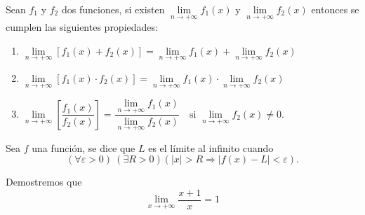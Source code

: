 \begin{property}
	Sean \(f_1\) y \(f_2\) dos funciones, si existen \(\lim\limits_{n\to+\infty}f_1(x)\) y \(\lim\limits_{n\to+\infty}f_2(x)\) entonces se cumplen las siguientes propiedades:
	\begin{enumerate}
		\item \(\lim\limits_{n\to+\infty}\left[f_1(x)+f_2(x)\right]=\lim\limits_{n\to+\infty}f_1(x)+\lim\limits_{n\to+\infty}f_2(x)\)						\item \(\lim\limits_{n\to+\infty}\left[f_1(x)\cdot f_2(x)\right]=\lim\limits_{n\to+\infty}f_1(x)\cdot\lim\limits_{n\to+\infty}f_2(x)\)
		\item \(\lim\limits_{n\to+\infty}\left[\dfrac{f_1(x)}{f_2(x)}\right]=\dfrac{\lim\limits_{n\to+\infty}f_1(x)}{\lim\limits_{n\to+\infty}f_2(x)}\quad\text{si }\lim\limits_{n\to+\infty}f_2(x)\neq 0 .\)
	\end{enumerate}
\end{property}

\begin{definition}
	Sea \(f\) una funci\'on, se dice que \(L\) es el l\'imite al infinito cuando
	\[\left(\forall\varepsilon>0\right)\:\left(\exists R>0\right)\left(\left|x\right|>R\Rightarrow\left|f(x)-L\right|<\varepsilon\right).\]
\end{definition}

\begin{exercise}
Demostremos que 
\[
	\lim\limits_{x\to+\infty}{\dfrac{x+1}{x}}=1
\]

\end{exercise}


